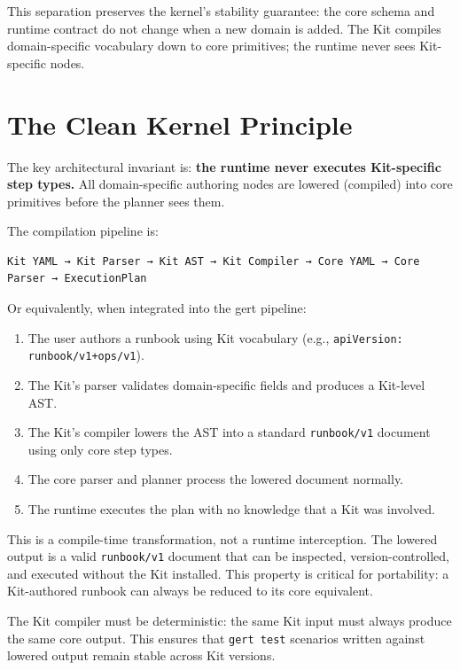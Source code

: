 This separation preserves the kernel's stability guarantee: the core schema and
runtime contract do not change when a new domain is added.  The Kit compiles
domain-specific vocabulary down to core primitives; the runtime never sees
Kit-specific nodes.

\section{The Clean Kernel Principle}
\label{sec:kit-clean-kernel}

The key architectural invariant is: \textbf{the runtime never executes
Kit-specific step types.}  All domain-specific authoring nodes are lowered
(compiled) into core primitives before the planner sees them.

The compilation pipeline is:

\begin{verbatim}
Kit YAML → Kit Parser → Kit AST → Kit Compiler → Core YAML → Core Parser → ExecutionPlan
\end{verbatim}

Or equivalently, when integrated into the gert pipeline:

\begin{enumerate}
  \item The user authors a runbook using Kit vocabulary (e.g.,
    \texttt{apiVersion: runbook/v1+ops/v1}).
  \item The Kit's parser validates domain-specific fields and produces a
    Kit-level AST.
  \item The Kit's compiler lowers the AST into a standard \texttt{runbook/v1}
    document using only core step types.
  \item The core parser and planner process the lowered document normally.
  \item The runtime executes the plan with no knowledge that a Kit was
    involved.
\end{enumerate}

This is a compile-time transformation, not a runtime interception.  The lowered
output is a valid \texttt{runbook/v1} document that can be inspected,
version-controlled, and executed without the Kit installed.  This property is
critical for portability: a Kit-authored runbook can always be reduced to its
core equivalent.

The Kit compiler must be deterministic: the same Kit input must always produce
the same core output.  This ensures that \texttt{gert test} scenarios written
against lowered output remain stable across Kit versions.


